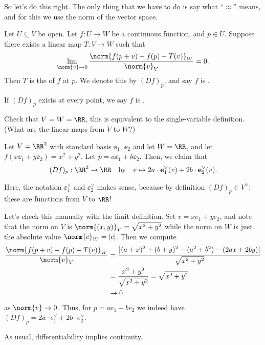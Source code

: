 So let's do this right.
The only thing that we have to do is say what ``$\approx$'' means, and for
this we use the norm of the vector space.
\begin{definition}
	Let $U \subseteq V$ be open.
	Let $f : U \to W$ be a continuous function, and $p \in U$.
	Suppose there exists a linear map $T : V \to W$ such that
	\[
		\lim_{\norm{v} \to 0}
		\frac{\norm{f(p + v) - f(p) - T(v)}_W}{\norm{v}_V} = 0.
	\]
	Then $T$ is the  of $f$ at $p$.
	We denote this by $(Df)_p$, and say $f$ is .

	If $(Df)_p$ exists at every point, we say $f$ is .
\end{definition}

\begin{ques}
	Check that $V = W = \RR$, this is equivalent to the single-variable definition.
	(What are the linear maps from $V$ to $W$?)
\end{ques}
\begin{example}[Total Derivative of $f(x,y) = x^2+y^2$]
	Let $V = \RR^2$ with standard basis $\ee_1$, $\ee_2$ and let $W = \RR$,
	and let $f\left( x \ee_1 + y \ee_2 \right) = x^2+y^2$.  Let $p = a\ee_1 + b\ee_2$.
	Then, we claim that \[ (Df)_p : \RR^2 \to \RR \quad\text{by}\quad
	v \mapsto 2a \cdot \ee_1^\vee(v) + 2b \cdot \ee_2^\vee(v). \]
\end{example}
Here, the notation $\ee_1^\vee$ and $\ee_2^\vee$ makes sense,
because by definition $(Df)_p \in V^\vee$: these are functions from $V$ to $\RR$!

Let's check this manually with the limit definition.
Set $v = xe_1 + ye_2$, and note that the norm on $V$ is $\norm{(x,y)}_V = \sqrt{x^2+y^2}$
while the norm on $W$ is just the absolute value $\norm{c}_W = \left\lvert c \right\rvert$.
Then we compute
\begin{align*}
	\frac{\norm{f(p + v) - f(p) - T(v)}_W}{\norm{v}_V} 
	&= \frac{\left\lvert (a+x)^2 + (b+y)^2 - (a^2+b^2) - (2ax+2by) \right\rvert}{\sqrt{x^2+y^2}} \\
	&= \frac{x^2+y^2}{\sqrt{x^2+y^2}} = \sqrt{x^2+y^2} \\
	&\to 0
\end{align*}
as $\norm{v} \to 0$.
Thus, for $p = ae_1 + be_2$ we indeed have $(Df)_p = 2a \cdot e_1^\vee + 2b \cdot e_2^\vee$.

\begin{remark}
	As usual, differentiability implies continuity.
\end{remark}

